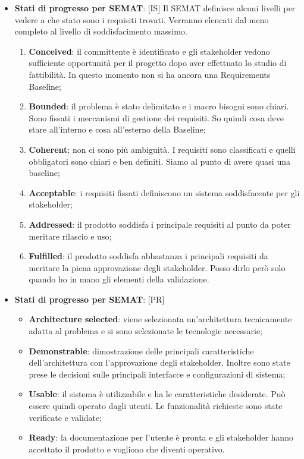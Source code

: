 \begin{itemize}
	\item \textbf{Stati di progresso per SEMAT}: [IS] Il SEMAT definisce alcuni livelli per vedere a che stato sono i requisiti trovati. Verranno elencati dal meno completo al livello di soddisfacimento massimo.
		\begin{enumerate}
			\item \textbf{Conceived}: il committente è identificato e gli stakeholder vedono sufficiente opportunità per il progetto dopo aver effettuato lo studio di fattibilità. In questo momento non si ha ancora una Requirements Baseline;
			\item \textbf{Bounded}: il problema è stato delimitato e i macro bisogni sono chiari. Sono fissati i meccanismi di gestione dei requisiti. So quindi cosa deve stare all'interno e cosa all'esterno della Baseline;
			\item \textbf{Coherent}; non ci sono più ambiguità. I requisiti sono classificati e quelli obbligatori sono chiari e ben definiti. Siamo al punto di avere quasi una baseline;
			\item \textbf{Acceptable}: i requisiti fissati definiscono un sistema soddisfacente per gli stakeholder;
			\item \textbf{Addressed}: il prodotto soddisfa i principale requisiti al punto da poter meritare rilascio e uso;
			\item \textbf{Fulfilled}: il prodotto soddisfa abbastanza i principali requisiti da meritare la piena approvazione degli stakeholder. Posso dirlo però solo quando ho in mano gli elementi della validazione.
		\end{enumerate}

	\item \textbf{Stati di progresso per SEMAT}: [PR]
		\begin{itemize}
			\item \textbf{Architecture selected}: viene selezionata un'architettura tecnicamente adatta al problema e si sono selezionate le tecnologie necessarie;
			\item \textbf{Demonstrable}: dimostrazione delle principali caratteristiche dell'architettura con l'approvazione degli stakeholder. Inoltre sono state prese le decisioni sulle principali interfacce e configurazioni di sistema;
			\item \textbf{Usable}: il sistema è utilizzabile e ha le caratteristiche desiderate. Può essere quindi operato dagli utenti. Le funzionalità richieste sono state verificate e validate;
			\item \textbf{Ready}: la documentazione per l'utente è pronta e gli stakeholder hanno accettato il prodotto e vogliono che diventi operativo.





\end{itemize}
\end{itemize}
